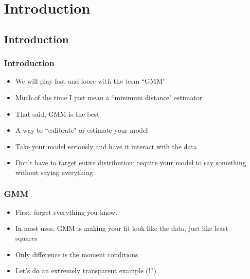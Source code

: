 \documentclass{beamer}
\date{}
\author{Trevor Gallen}
\begin{document}
\renewcommand*{\inserttotalframenumber}{\pageref{lastframe}}

\begin{frame}
\titlepage
\end{frame}


\section{Introduction}
\subsection{Introduction}
\begin{frame}
\frametitle{Introduction}
\begin{itemize}
\item We will play fast and loose with the term ``GMM"
\bigskip
\item Much of the time I just mean a ``minimum distance" estimator
\bigskip
\item That said, GMM is the best
\bigskip
\item A way to ``calibrate" or estimate your model
\bigskip
\item Take your model seriously and have it interact with the data
\bigskip
\item Don't have to target entire distribution: require your model to say something without saying everything
\end{itemize}
\end{frame}


\begin{frame}
\frametitle{GMM}
\begin{itemize}
\item First, forget everything you know.
\bigskip
\item In most uses, GMM is making your fit look like the data, just like least squares
\bigskip
\item Only difference is the moment conditions
\bigskip
\item Let's do an extremely transparent example (!?)
\end{itemize}
\end{frame}
\end{document}
